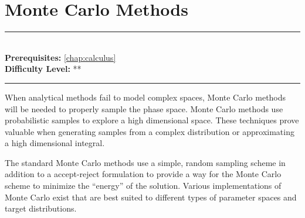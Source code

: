 \documentclass[book.tex]{subfiles}
\begin{document}
\chapter{Monte Carlo Methods}

\label{chap:monte_carlo}
\noindent\rule{11cm}{0.4pt} \\
\textbf{Prerequisites:} \autoref{chap:calculus} \\
\textbf{Difficulty Level:} ** \\
\noindent\rule{11cm}{0.4pt}
\vspace{5mm}

When analytical methods fail to model complex spaces, Monte Carlo methods will be needed to properly sample the phase space. Monte Carlo methods use probabilistic samples to explore a high dimensional space. These techniques prove valuable when generating samples from a complex distribution or approximating a high dimensional integral.

The standard Monte Carlo methods use a simple, random sampling scheme in addition to a accept-reject formulation to provide a way for the Monte Carlo scheme to minimize the ``energy'' of the solution. Various implementations of Monte Carlo exist that are best suited to different types of parameter spaces and target distributions.


\end{document}
